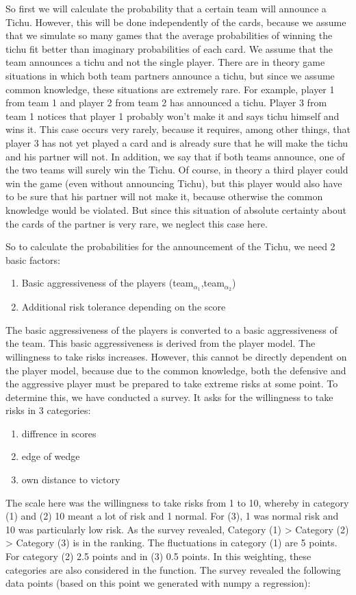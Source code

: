 So first we will calculate the probability that a certain team will announce a Tichu. However, this will be done independently of the cards, because we assume that we simulate so many games that the average probabilities of winning the tichu fit better than imaginary probabilities of each card.
We assume that the team announces a tichu and not the single player. There are in theory game situations in which both team partners announce a tichu, but since we assume common knowledge, these situations are extremely rare. For example, player 1 from team 1 and player 2 from team 2 has announced a tichu. Player 3 from team 1 notices that player 1 probably won't make it and says tichu himself and wins it. This case occurs very rarely, because it requires, among other things, that player 3 has not yet played a card and is already sure that he will make the tichu and his partner will not.
In addition, we say that if both teams announce, one of the two teams will surely win the Tichu. Of course, in theory a third player could win the game (even without announcing Tichu), but this player would also have to be sure that his partner will not make it, because otherwise the common knowledge would be violated. But since this situation of absolute certainty about the cards of the partner is very rare, we neglect this case here.

So to calculate the probabilities for the announcement of the Tichu, we need 2 basic factors:
\begin{enumerate}
\item Basic aggressiveness of the players (team$_{\alpha_1}$,team$_{\alpha_2}$)
\item  Additional risk tolerance depending on the score
\end{enumerate}
The basic aggressiveness of the players is converted to a basic aggressiveness of the team. This basic aggressiveness is derived from the player model.
The willingness to take risks increases. However, this cannot be directly dependent on the player model, because due to the common knowledge, both the defensive and the aggressive player must be prepared to take extreme risks at some point.
To determine this, we have conducted a survey. It asks for the willingness to take risks in 3 categories:
\begin{enumerate}[(1)]
\item diffrence in scores
\item edge of wedge
\item own distance to victory
\end{enumerate}
The scale here was the willingness to take risks from 1 to 10, whereby in category (1) and (2) 10 meant a lot of risk and 1 normal. For (3), 1 was normal risk and 10 was particularly low risk.
 As the survey revealed, Category (1) > Category (2) > Category (3) is in the ranking. The fluctuations in category (1) are 5 points.
 For category (2) 2.5 points and in (3) 0.5 points. In this weighting, these categories are also considered in the function.
The survey revealed the following data points (based on this point we generated with numpy a regression):

